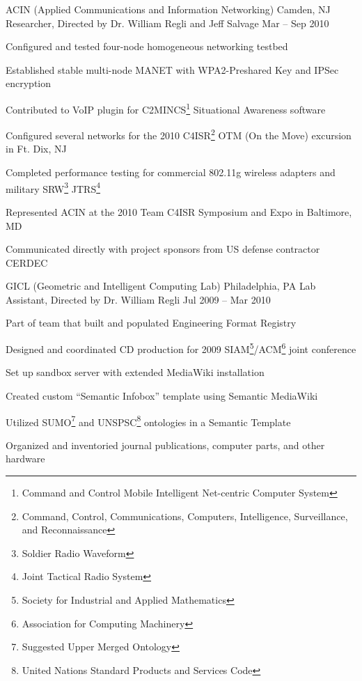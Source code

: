 \documentclass[10pt]{barag_resume}
\begin{document}
		\begin{job}{ACIN (Applied Communications and Information Networking)}
			{Camden, NJ}
			{Researcher, Directed by Dr. William Regli and Jeff Salvage}
			{Mar -- Sep 2010}
			\item Configured and tested four-node homogeneous networking testbed
			\item Established stable multi-node MANET with WPA2-Preshared Key and IPSec encryption
			\item Contributed to VoIP plugin for C2MINCS\footnote{Command and Control Mobile Intelligent Net-centric Computer System} Situational Awareness software
			\item Configured several networks for the 2010 C4ISR\footnote{Command, Control, Communications, Computers, Intelligence, Surveillance, and Reconnaissance} OTM (On the Move) excursion in Ft. Dix, NJ
			\item Completed performance testing for commercial 802.11g wireless adapters and military SRW\footnote{Soldier Radio Waveform} JTRS\footnote{Joint Tactical Radio System}
			\item Represented ACIN at the 2010 Team C4ISR Symposium and Expo in Baltimore, MD
			\item Communicated directly with project sponsors from US defense contractor CERDEC
		\end{job}

		\begin{job}{GICL (Geometric and Intelligent Computing Lab)}
			{Philadelphia, PA}
			{Lab Assistant, Directed by Dr. William Regli}
			{Jul 2009 -- Mar 2010}
			\item Part of team that built and populated Engineering Format Registry
			\item Designed and coordinated CD production for 2009 SIAM\footnote{Society for Industrial and Applied Mathematics}/ACM\footnote{Association for Computing Machinery} joint conference
			\item Set up sandbox server with extended MediaWiki installation
			\item Created custom ``Semantic Infobox'' template using Semantic MediaWiki
			\item Utilized SUMO\footnote{Suggested Upper Merged Ontology} and UNSPSC\footnote{United Nations Standard Products and Services Code} ontologies in a Semantic Template
			\item Organized and inventoried journal publications, computer parts, and other hardware
		\end{job}
\end{document}
